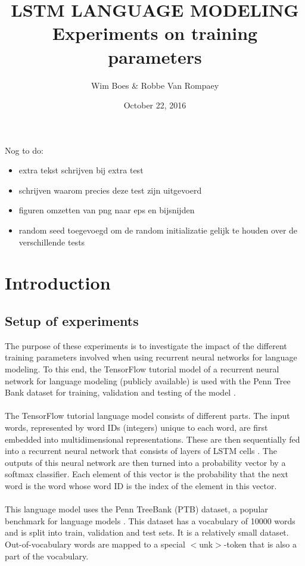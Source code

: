 \documentclass[10pt,a4paper,titlepage]{article}
\author{Wim Boes \& Robbe Van Rompaey}
\title{LSTM LANGUAGE MODELING\\Experiments on training parameters}
\date{October 22, 2016}
\begin{document}
\maketitle	

\setcounter{tocdepth}{2}
\tableofcontents

\newpage


Nog to do:
\begin{itemize}
\item extra tekst schrijven bij extra test
\item schrijven waarom precies deze test zijn uitgevoerd
\item figuren omzetten van png naar eps en bijsnijden
\item random seed toegevoegd om de random initializatie gelijk te houden over de verschillende tests
\end{itemize}

\section{Introduction}

\subsection{Setup of experiments}
\label{sec:setup}

The purpose of these experiments is to investigate the impact of the different training parameters involved when using recurrent neural networks for language modeling. To this end, the TensorFlow tutorial model of a recurrent neural network for language modeling (publicly available) is used with the Penn Tree Bank dataset for training, validation and testing of the model \cite{tensorflow}.\\
\\
The TensorFlow tutorial language model consists of different parts. The input words, represented by word IDs (integers) unique to each word, are first embedded into multidimensional representations. These are then sequentially fed into a recurrent neural network that consists of layers of LSTM cells \cite{LSTM}. The outputs of this neural network are then turned into a probability vector by a softmax classifier. Each element of this vector is the probability that the next word is the word whose word ID is the index of the element in this vector.\\
\\
This language model uses the Penn TreeBank (PTB) dataset, a popular benchmark for language models \cite{PTB}. This dataset has a vocabulary of 10000 words and is split into train, validation and test sets. It is a relatively small dataset. Out-of-vocabulary words are mapped to a special $<$unk$>$-token that is also a part of the vocabulary.
\end{document}
